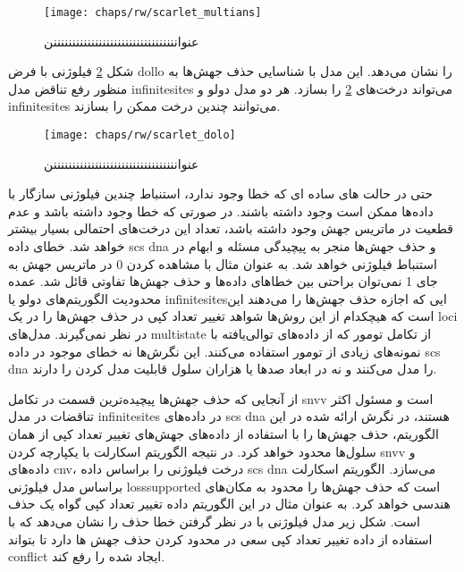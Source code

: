 \begin{figure}[!ht]
	\centerline{\texttt{[image: chaps/rw/scarlet\_multians]}}
	\caption{عنوانننننننننننننننننننننننننننننننننن}
	\label{fig:ch_rw:scarlet_multians}
\end{figure}

شکل \ref{fig:ch_rw:scarlet_dolo} فیلوژنی با فرض \gls{dollo} را نشان می‌دهد. این مدل با شناسایی حذف جهش‌ها به منظور رفع تناقض مدل  \gls{infinitesites} می‌تواند درخت‌های \ref{fig:ch_rw:scarlet_dolo} را بسازد. هر دو مدل دولو و \gls{infinitesites} می‌توانند چندین درخت ممکن را بسازند. 
\begin{figure}[!ht]
	\centerline{\texttt{[image: chaps/rw/scarlet\_dolo]}}
	\caption{عنوانننننننننننننننننننننننننننننننننن}
	\label{fig:ch_rw:scarlet_dolo}
\end{figure}
حتی در حالت های ساده ای که خطا وجود ندارد، استنباط چندین فیلوژنی سازگار با داده‌ها ممکن است وجود داشته باشند. در صورتی که خطا وجود داشته باشد و عدم قطعیت در ماتریس جهش وجود داشته باشد، تعداد این درخت‌های احتمالی بسیار بیشتر خواهد شد. خطای داده \gls{scs} \gls{dna} و حذف جهش‌ها منجر به پیچیدگی مسئله و ابهام در استنباط فیلوژنی خواهد شد. به عنوان مثال با مشاهده کردن 0 در ماتریس جهش به جای 1 نمی‌توان براحتی بین خطاهای داده‌ها و حذف جهش‌ها تفاوتی قائل شد. عمده محدودیت الگوریتم‌های دولو یا \gls{infinitesites}ایی که اجازه حذف جهش‌ها را می‌دهند این است که هیچکدام از این روش‌ها شواهد تغییر تعداد کپی در حذف جهش‌ها را در یک  \gls{loci} در نظر نمی‌گیرند. مدل‌های \gls{multistate} از تکامل تومور که از داده‌های توالی‌یافته با نمونه‌های زیادی از تومور استفاده می‌کنند. این نگرش‌ها نه خطای موجود در داده \gls{scs} \gls{dna} را مدل می‌کنند و نه در ابعاد صدها یا هزاران سلول قابلیت مدل کردن را دارند. 

از آنجایی که حذف جهش‌ها پیچیده‌ترین قسمت در تکامل \gls{snvv} است و مسئول اکثر تناقضات در مدل \gls{infinitesites} در داده‌های \gls{scs} \gls{dna} هستند، در نگرش ارائه شده در این الگوریتم، حذف جهش‌ها را با  استفاده از داده‌های جهش‌های تغییر تعداد کپی از همان سلول‌ها محدود خواهد کرد. در نتیجه الگوریتم اسکارلت با یکپارچه کردن \gls{snvv} و داده‌های \gls{cnv}، درخت فیلوژنی را براساس داده \gls{scs} \gls{dna}  می‌سازد. الگوریتم اسکارلت براساس مدل فیلوژنی \gls{losssupported} است که حذف جهش‌ها را محدود به مکان‌های هندسی خواهد کرد. به عنوان مثال در این الگوریتم  داده تغییر تعداد کپی گواه یک حذف است. شکل زیر مدل فیلوژنی با در نظر گرفتن خطا حذف را نشان می‌دهد که با استفاده از داده تغییر تعداد کپی  سعی در محدود کردن حذف جهش ها دارد تا بتواند \gls{conflict} ایجاد شده را رفع کند. 

